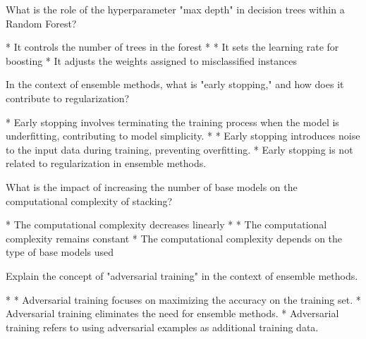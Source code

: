 \documentclass[10pt]{extarticle}
\begin{document}
\begin{exercise}
    What is the role of the hyperparameter "max depth" in decision trees within a Random Forest?
    \begin{choice}
        * It controls the number of trees in the forest
        * 
        * It sets the learning rate for boosting
        * It adjusts the weights assigned to misclassified instances
    \end{choice}
\end{exercise}
\begin{solution}
\end{solution}

\begin{exercise}
    In the context of ensemble methods, what is "early stopping," and how does it contribute to regularization?
    \begin{choice}
        * Early stopping involves terminating the training process when the model is underfitting, contributing to model simplicity.
        * 
        * Early stopping introduces noise to the input data during training, preventing overfitting.
        * Early stopping is not related to regularization in ensemble methods.
    \end{choice}
\end{exercise}
\begin{solution}
\end{solution}

\begin{exercise}
    What is the impact of increasing the number of base models on the computational complexity of stacking?
    \begin{choice}
        * The computational complexity decreases linearly
        * 
        * The computational complexity remains constant
        * The computational complexity depends on the type of base models used
    \end{choice}
\end{exercise}
\begin{solution}
\end{solution}

\begin{exercise}
    Explain the concept of "adversarial training" in the context of ensemble methods.
    \begin{choice}
        * 
        * Adversarial training focuses on maximizing the accuracy on the training set.
        * Adversarial training eliminates the need for ensemble methods.
        * Adversarial training refers to using adversarial examples as additional training data.
    \end{choice}
\end{exercise}
\begin{solution}
\end{solution}
\end{document}
